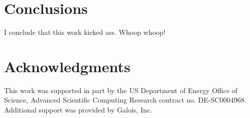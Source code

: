 \section{Conclusions}

I conclude that this work kicked ass.  Whoop whoop!

\section{Acknowledgments}

This work was supported in part by the US Department of
Energy Office of Science, Advanced Scientific Computing Research
contract no. DE-SC0004968.  Additional support was provided by Galois,
Inc.
